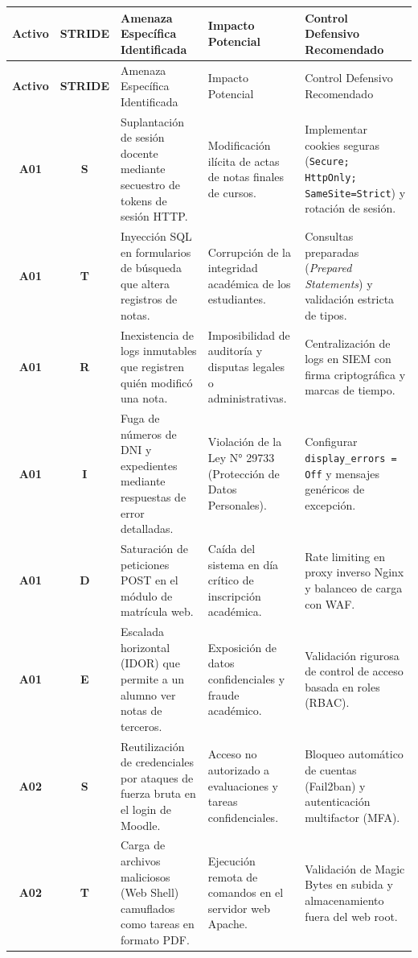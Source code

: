 \begin{center}
\footnotesize
\begin{longtable}{>{\bfseries}c >{\bfseries}c p{3.8cm} p{3.8cm} p{3.5cm}}
\toprule
\rowcolor{outermarginbgcolor}
Activo & STRIDE & Amenaza Específica Identificada & Impacto Potencial & Control Defensivo Recomendado \\
\midrule
\endfirsthead
\toprule
\rowcolor{outermarginbgcolor}
Activo & STRIDE & Amenaza Específica Identificada & Impacto Potencial & Control Defensivo Recomendado \\
\midrule
\endhead
\bottomrule
\endfoot
A01 & S & Suplantación de sesión docente mediante secuestro de tokens de sesión HTTP. & Modificación ilícita de actas de notas finales de cursos. & Implementar cookies seguras (\texttt{Secure; HttpOnly; SameSite=Strict}) y rotación de sesión. \\
\midrule
A01 & T & Inyección SQL en formularios de búsqueda que altera registros de notas. & Corrupción de la integridad académica de los estudiantes. & Consultas preparadas (\textit{Prepared Statements}) y validación estricta de tipos. \\
\midrule
A01 & R & Inexistencia de logs inmutables que registren quién modificó una nota. & Imposibilidad de auditoría y disputas legales o administrativas. & Centralización de logs en SIEM con firma criptográfica y marcas de tiempo. \\
\midrule
A01 & I & Fuga de números de DNI y expedientes mediante respuestas de error detalladas. & Violación de la Ley N° 29733 (Protección de Datos Personales). & Configurar \texttt{display\_errors = Off} y mensajes genéricos de excepción. \\
\midrule
A01 & D & Saturación de peticiones POST en el módulo de matrícula web. & Caída del sistema en día crítico de inscripción académica. & Rate limiting en proxy inverso Nginx y balanceo de carga con WAF. \\
\midrule
A01 & E & Escalada horizontal (IDOR) que permite a un alumno ver notas de terceros. & Exposición de datos confidenciales y fraude académico. & Validación rigurosa de control de acceso basada en roles (RBAC). \\
\midrule
A02 & S & Reutilización de credenciales por ataques de fuerza bruta en el login de Moodle. & Acceso no autorizado a evaluaciones y tareas confidenciales. & Bloqueo automático de cuentas (Fail2ban) y autenticación multifactor (MFA). \\
\midrule
A02 & T & Carga de archivos maliciosos (Web Shell) camuflados como tareas en formato PDF. & Ejecución remota de comandos en el servidor web Apache. & Validación de Magic Bytes en subida y almacenamiento fuera del web root. \\

\end{longtable}
\end{center}
